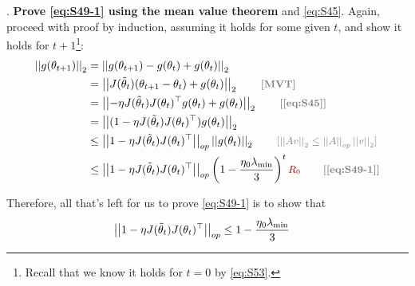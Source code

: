 \documentclass{article}
\begin{document}
\begin{appendices}
. \textbf{Prove \ref{eq:S49-1} using the mean value theorem} and \ref{eq:S45}. Again, proceed with proof by induction, assuming it holds for some given $t$, and show it holds for $t +1$\footnote{Recall that we know it holds for $t = 0$ by \ref{eq:S53}.}:
\begin{align}
	\norm{g(\theta_{t+1})} 
		&= \norm{g(\theta_{t+1}) - g(\theta_t) + g(\theta_t)} \\
		&= \norm{J(\tilde\theta_t) (\theta_{t+1} - \theta_t) + g(\theta_t)} 
			\qquad \mtgray{[MVT]} \\
		&= \norm{-\eta J(\tilde\theta_t) J(\theta_t)^\top g(\theta_t) + g(\theta_t)} 
			\qquad \mtgray{[\ref{eq:S45}]} \\
		&=  \norm{(1 -\eta J(\tilde\theta_t) J(\theta_t)^\top) g(\theta_t) } \\ 
		&\leq \norm[op]{1 - \eta J(\tilde\theta_t) J(\theta_t)^\top} \norm{g(\theta_t)}
			\qquad \mgray{[ \norm{Av} \leq \norm[op]{A}\norm{v}  ]}  \\
		&\leq \norm[op]{1 - \eta J(\tilde\theta_t) J(\theta_t)^\top} \lr{1 - \frac{\eta_0 \lambda_{\text{min}}}{3}}^t \r 
			\qquad \mtgray{[\ref{eq:S49-1}]}
\end{align} 


Therefore, all that's left for us to prove \ref{eq:S49-1} is to show that
\begin{align}
	 \norm[op]{1 - \eta J(\tilde\theta_t) J(\theta_t)^\top}
	  	&\leq  1 - \frac{\eta_0 \lambda_{\text{min}}}{3}
\end{align}


\end{appendices}
\end{document}
